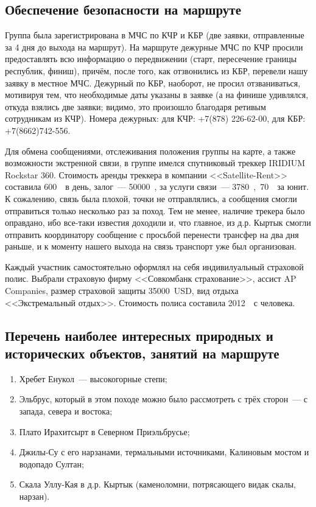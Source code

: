 \subsection{Обеспечение безопасности на маршруте}
Группа была зарегистрирована в МЧС по КЧР и КБР (две заявки, отправленные за 4 дня до выхода на маршрут). На маршруте дежурные МЧС по КЧР просили предоставлять всю информацию о передвижении (старт, пересечение границы республик, финиш), причём, после того, как отзвонились из КБР, перевели нашу заявку в местное МЧС. Дежурный по КБР, наоборот, не просил отзваниваться, мотивируя тем, что необходимые даты указаны в заявке (а на финише удивлялся, откуда взялись две заявки; видимо, это произошло благодаря ретивым сотрудникам из КЧР). Номера дежурных: для КЧР: +7(878) 226-62-00, для КБР: +7(8662)742-556.

Для обмена сообщениями, отслеживания положения группы на карте, а также возможности экстренной связи, в группе имелся спутниковый треккер IRIDIUM Rockstar 360. Стоимость аренды треккера в компании <<Satellite-Rent>> составила 600~\faRub~в день, залог~--- 50000~\faRub, за услуги связи~--- 3780~\faRuble,~70~\faRub~за юнит. К сожалению, связь была плохой, точки не отправлялись, а сообщения смогли отправиться только несколько раз за поход. Тем не менее, наличие трекера было оправдано, ибо все-таки известия доходили и, что главное, из д.р. Кыртык смогли отправить координатору сообщение с просьбой перенести трансфер на два дня раньше, и к моменту нашего выхода на связь транспорт уже был организован.

Каждый участник самостоятельно оформлял на себя индивилуальный страховой полис. Выбрали страховую фирму <<Совкомбанк страхование>>, ассист AP Companies, размер страховой защиты 35000~USD,  вид отдыха <<Экстремальный отдых>>. Стоимость полиса составила 2012~\faRuble~с человека.

\subsection{Перечень наиболее интересных природных и исторических объектов, занятий на маршруте}
\begin{enumerate}[noitemsep,topsep=0pt,parsep=0pt,partopsep=0pt]
	\item Хребет Енукол~--- высокогорные степи;
	\item Эльбрус, который в этом походе можно было рассмотреть с трёх сторон~--- с запада, севера и востока;
	\item Плато Ирахитсырт в Северном Приэльбрусье;
	\item Джилы-Су с его нарзанами, термальными источниками, Калиновым мостом и водопадо Султан;
	\item Скала Уллу-Кая в д.р. Кыртык (каменоломни, потрясающего видак скалы, нарзан).
\end{enumerate}

